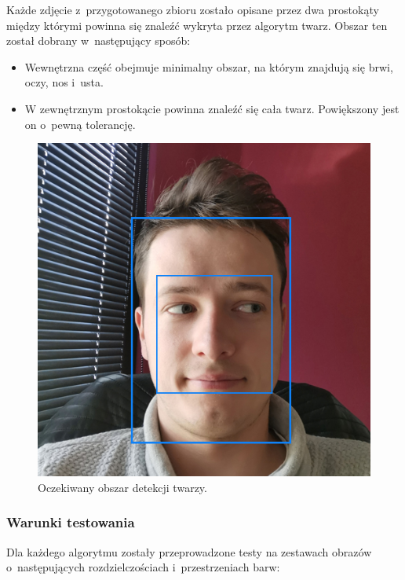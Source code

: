 Każde zdjęcie z~przygotowanego zbioru zostało opisane przez dwa prostokąty między którymi powinna się znaleźć wykryta przez algorytm twarz. Obszar ten został dobrany w~następujący sposób:

\begin{itemize}
    \item Wewnętrzna część obejmuje minimalny obszar, na którym znajdują się brwi, oczy, nos i~usta.
    \item W zewnętrznym prostokącie powinna znaleźć się cała twarz. Powiększony jest on o~pewną tolerancję. 
\end{itemize}

\begin{figure}[!h]
    \begin{center}
        \includegraphics[scale=0.3]{img/face_section/face_test_expected.jpg}
        \caption{Oczekiwany obszar detekcji twarzy. }
        \label{fig:face_test_expected}
    \end{center}
\end{figure}

\subsubsection{Warunki testowania}

Dla każdego algorytmu zostały przeprowadzone testy na zestawach obrazów o~następujących rozdzielczościach i~przestrzeniach barw:

